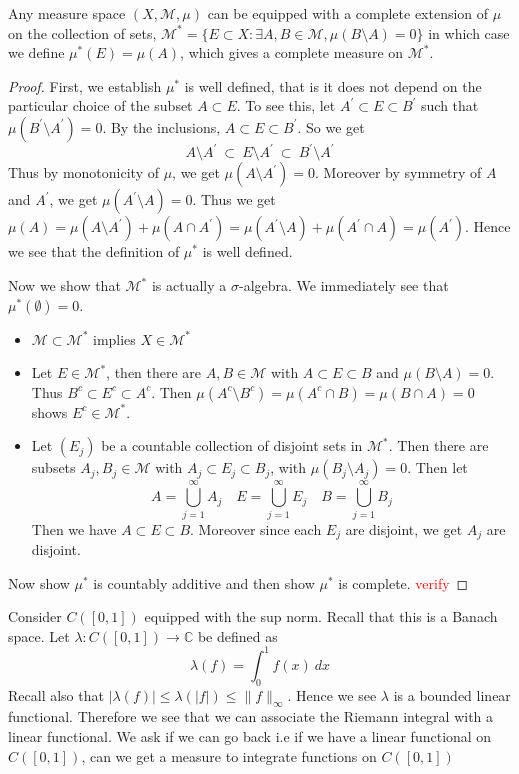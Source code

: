 \begin{theorem}
  Any measure space $(X, \mathcal{M}, \mu)$ can be equipped with a complete extension of $\mu$ on the collection of sets, $\mathcal{M}^{*} = \{ E \subset X : \exists A, B \in \mathcal{M}, \mu(B \setminus A) = 0 \}$
  in which case we define $\mu^{*}(E) = \mu(A)$, which gives a complete measure on $\mathcal{M}^{*}$.
\end{theorem}
\begin{proof}
  First, we establish $\mu^{*}$ is well defined, that is it does not depend on the particular choice of the subset $A \subset E$. To see this, let $A^\prime \subset E \subset B^\prime$ such that $\mu(B^\prime \setminus A^\prime) = 0$. By the inclusions, $A \subset E \subset B^\prime$. So we get \[
       A \setminus A^\prime \ \subset \  E \setminus A^\prime \ \subset \ B^\prime\setminus A^\prime
  \]
  Thus by monotonicity of $\mu$, we get $\mu(A\setminus A^\prime) = 0$. Moreover by symmetry of $A$ and $A^\prime$, we get $\mu(A^\prime \setminus A) = 0$.
  Thus we get $\mu(A) = \mu(A \setminus A^\prime) + \mu(A \cap A^\prime) = \mu(A^\prime \setminus A) + \mu(A^\prime \cap A) = \mu(A^\prime)$. Hence we see that the definition of $\mu^{*}$ is well defined.

  Now we show that $\mathcal{M}^*$ is actually a $\sigma$-algebra. We immediately see that $\mu^{*}(\emptyset) = 0$. \begin{itemize}
    \item $\mathcal{M} \subset \mathcal{M}^{*}$ implies $X \in \mathcal{M}^{*}$
    \item Let $E \in \mathcal{M}^*$, then there are $ A, B \in \mathcal{M}$ with $A \subset E \subset B$ and $ \mu(B\setminus A) = 0$. Thus $B^c \subset E^c \subset A^c$. Then $\mu(A^c \setminus B^c) = \mu(A^c \cap B) = \mu(B \cap A) = 0$ shows $ E^c \in \mathcal{M}^*$.
    \item Let $(E_j)$ be a countable collection of disjoint sets in $\mathcal{M}^{*}$. Then there are subsets $A_j, B_j \in \mathcal{M}$ with $A_j \subset E_j \subset B_j$, with $\mu(B_j \setminus A_j) = 0$. Then let \[
        A = \bigcup_{j = 1}^{\infty}A_j \quad E = \bigcup_{j = 1}^{\infty}E_j \quad B = \bigcup_{j = 1}^{\infty}B_j
    \]
      Then we have $A \subset E \subset B$. Moreover since each $E_j$ are disjoint, we get $A_j$ are disjoint.
  \end{itemize}

  Now show $\mu^{*}$ is countably additive and then show $\mu^{*}$ is complete. \textcolor{red}{verify}
\end{proof}

\begin{remark}
  Consider $C([0, 1])$ equipped with the sup norm. Recall that this is a Banach space. Let $\lambda: C([0, 1]) \to \mathbb{C}$ be defined as \[
    \lambda(f) = \int_{0}^{1} f(x) \ dx
  \]
  Recall also that $|\lambda(f)| \le \lambda(|f|) \le \|f\|_\infty$. Hence we see $\lambda$ is a bounded linear functional. Therefore we see that we can associate the Riemann integral with a linear functional. We ask if we can go back i.e if we have a linear functional on $C([0, 1])$, can we get a measure to integrate functions on $C([0, 1])$
\end{remark}
